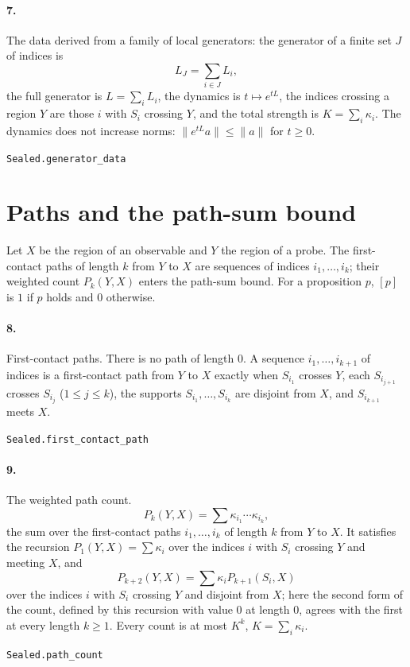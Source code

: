 \documentclass[11pt]{article}
\begin{document}
\paragraph{7.} The data derived from a family of local generators: the generator of a finite set $J$ of indices is \[L_J = \sum_{i \in J} L_i,\] the full generator is $L = \sum_i L_i$, the dynamics is $t \mapsto e^{tL}$, the indices crossing a region $Y$ are those $i$ with $S_i$ crossing $Y$, and the total strength is $K = \sum_i \kappa_i$. The dynamics does not increase norms: $\|e^{tL} a\| \le \|a\|$ for $t \ge 0$.\par{\footnotesize\texttt{Sealed.generator\_data}}

\section*{Paths and the path-sum bound}
Let $X$ be the region of an observable and $Y$ the region of a probe. The first-contact paths of length $k$ from $Y$ to $X$ are sequences of indices $i_1, \dots, i_k$; their weighted count $P_k(Y, X)$ enters the path-sum bound. For a proposition $p$, $[p]$ is $1$ if $p$ holds and $0$ otherwise.

\paragraph{8.} First-contact paths. There is no path of length $0$. A sequence $i_1, \dots, i_{k+1}$ of indices is a first-contact path from $Y$ to $X$ exactly when $S_{i_1}$ crosses $Y$, each $S_{i_{j+1}}$ crosses $S_{i_j}$ ($1 \le j \le k$), the supports $S_{i_1}, \dots, S_{i_k}$ are disjoint from $X$, and $S_{i_{k+1}}$ meets $X$.\par{\footnotesize\texttt{Sealed.first\_contact\_path}}

\paragraph{9.} The weighted path count. \[P_k(Y, X) = \sum \kappa_{i_1} \cdots \kappa_{i_k},\] the sum over the first-contact paths $i_1, \dots, i_k$ of length $k$ from $Y$ to $X$. It satisfies the recursion $P_1(Y, X) = \sum \kappa_i$ over the indices $i$ with $S_i$ crossing $Y$ and meeting $X$, and \[P_{k+2}(Y, X) = \sum \kappa_i P_{k+1}(S_i, X)\] over the indices $i$ with $S_i$ crossing $Y$ and disjoint from $X$; here the second form of the count, defined by this recursion with value $0$ at length $0$, agrees with the first at every length $k \ge 1$. Every count is at most $K^k$, $K = \sum_i \kappa_i$.\par{\footnotesize\texttt{Sealed.path\_count}}
\end{document}
